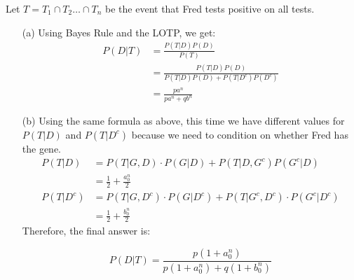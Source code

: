 \documentclass[11pt]{article}
\begin{document}
\begin{solution}{3} 
Let $T = T_1 \cap T_2 \ldots \cap T_n$ be the event that Fred tests positive on all tests. 
\begin{enumerate}
\item [(a)] Using Bayes Rule and the LOTP, we get: 
\begin{align*}
P(D | T) &= \frac{P(T | D) P(D)}{P(T)} \\ 
&= \frac{P(T | D) P(D)}{P(T | D) P(D) + P(T | D^c) P(D^c)} \\ 
&= \boxed{\frac{pa^n}{pa^n + qb^n}}
\end{align*}
\item [(b)] Using the same formula as above, this time we have different values for $P(T | D)$ and $P(T | D^c)$ because we need to condition on whether Fred has the gene. 
\begin{align*}
P(T | D) &= P(T | G, D) \cdot P(G | D) + P(T | D, G^c) P(G^c | D) \\ 
&= \frac{1}{2} + \frac{a_0^n}{2} \\ 
P(T | D^c) &= P(T | G, D^c) \cdot P(G | D^c) + P(T | G^c, D^c) \cdot P(G^c | D^c) \\ &= \frac{1}{2} + \frac{b_0^n}{2} 
\end{align*}
Therefore, the final answer is: 

$$ P(D | T) = \boxed{\frac{p(1 + a_0^n)}{p(1 + a_0^n) + q(1 + b_0^n)}}$$
\end{enumerate}

\end{solution}
\end{document}
